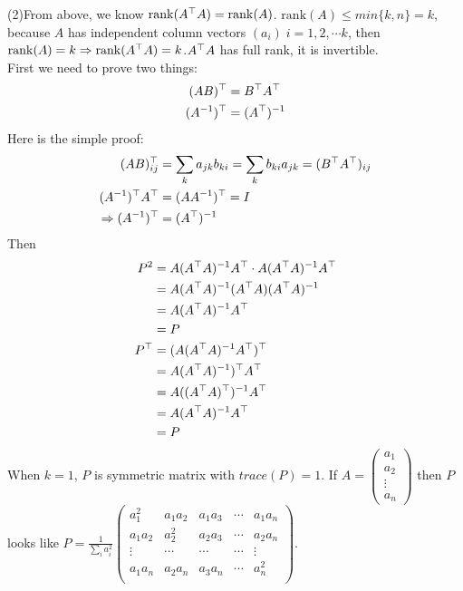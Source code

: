 \documentclass[12pt]{article}
\begin{document}
\medskip
(2)From above, we know $\mathrm{rank}(A^{\top} A) = \mathrm{rank}(A)$. $\mathrm{rank}(A) \leq min \{k, n\} = k$, because $A$ has independent column vectors $(a_i)\; i = 1,2, \cdots k$, then $\mathrm{rank}(A) = k \Rightarrow \mathrm{rank}(A^{\top} A) = k$.$A^{\top} A$ has full rank, it is invertible. \\
 First we need to prove two things:
 \begin{align*}
 (AB)^{\top} &= B^{\top} A^{\top} \\
 (A^{-1})^{\top} &= (A^{\top})^{-1}
 \end{align*}
 Here is the simple proof:
\begin{align*}
 (AB)^{\top}_{ij} &= \sum_k a_{jk}b_{ki} = \sum_k b_{ki}a_{jk} = (B^{\top} A^{\top})_{ij} \\
 (A^{-1})^{\top} A^{\top} &= (A A^{-1})^{\top} = I \\
 \Rightarrow (A^{-1})^{\top} &= (A^{\top})^{-1}
 \end{align*}
 Then 
 \begin{align*}
 P^2 &= A(A^{\top}A)^{-1} A^{\top} \cdot A(A^{\top}A)^{-1} A^{\top} \\
 &= A(A^{\top}A)^{-1} (A^{\top} A)(A^{\top}A)^{-1} \\
 &= A(A^{\top}A)^{-1} A^{\top} \\
 &= P \\
 P^{\top} &= ( A ( A^{\top} A)^{-1} A^{\top})^{\top} \\
 &=  A (A^{\top}A)^{-1})^{\top} A^{\top} \\
 &= A ((A^{\top}A)^{\top})^{-1} A^{\top} \\
 &= A(A^{\top}A)^{-1} A^{\top} \\
 &= P
 \end{align*}
 When $k=1$, $P$ is symmetric matrix with $trace(P) = 1$. If $A = 
\begin{pmatrix}
a_1 \\
a_2 \\
\vdots \\
a_n
\end{pmatrix} 
 $ then $P$ looks like $
 P = 
\frac{1}{\sum_i a_i^2}
\begin{pmatrix}
a_1^2 & a_1a_2 & a_1 a_3 & \cdots & a_1a_n \\
a_1a_2 & a_2^2 & a_2 a_3 & \cdots & a_2a_n \\
\vdots & \cdots & \cdots & \cdots & \vdots \\
a_1a_n & a_2a_n & a_3 a_n & \cdots & a_n^2 \\
\end{pmatrix} 
$.
\end{document}
